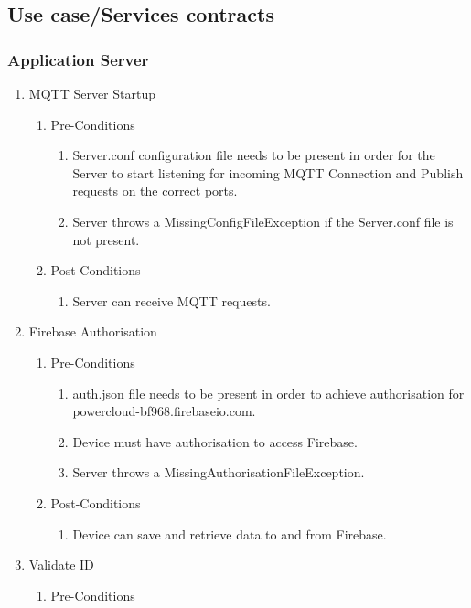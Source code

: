 \documentclass{article}
\begin{document}
\subsection{Use case/Services contracts}
\subsubsection{Application Server}
\begin{enumerate}
	\item	MQTT Server Startup
	\begin{enumerate}
		\item  Pre-Conditions
		\begin{enumerate}
			\item  	Server.conf configuration file needs to be present in order for the Server to start listening for incoming MQTT Connection and 
			Publish requests on the correct ports.
			\item	Server throws a MissingConfigFileException if the Server.conf file is not present.
		\end{enumerate}
		\item  Post-Conditions		
		\begin{enumerate}
			\item	Server can receive MQTT requests.
		\end{enumerate}
	\end{enumerate}
		\item	Firebase Authorisation
	\begin{enumerate}
		\item  Pre-Conditions
		\begin{enumerate}
			\item	auth.json file needs to be present in order to achieve authorisation for powercloud-bf968.firebaseio.com.
			\item	Device must have authorisation to access Firebase.
			\item	Server throws a MissingAuthorisationFileException.
		\end{enumerate}
		\item  Post-Conditions		
		\begin{enumerate}
			\item	Device can save and retrieve data to and from Firebase.
		\end{enumerate}
	\end{enumerate}
	\item Validate ID
	\begin{enumerate}
		\item  Pre-Conditions

\end{enumerate}
\end{enumerate}
\end{document}
